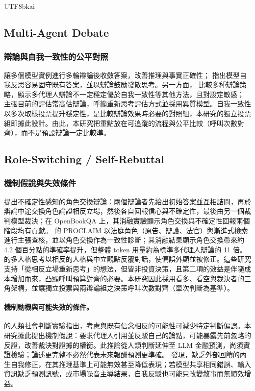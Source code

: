 \documentclass[12pt,a4paper]{article}
\begin{document}
\begin{CJK}{UTF8}{bkai}
\subsection{Multi-Agent Debate}

\subsubsection{辯論與自我一致性的公平對照}
\citet{du2023debate} 讓多個模型實例進行多輪辯論後收斂答案，改善推理與事實正確性；\citet{liang2023divergent} 指出模型自我反思容易固守既有答案，並以辯論鼓勵發散思考。另一方面，\citet{smit2023mad} 比較多種辯論策略，顯示多代理人辯論不一定穩定優於自我一致性等其他方法，且對設定敏感；\citet{zhang2025stop} 主張目前的評估常高估辯論，呼籲重新思考評估方式並採用異質模型。自我一致性 \citep{wang2023selfconsistency} 以多次取樣投票提升穩定性，是比較辯論效果時必要的對照組，本研究的獨立投票組即據此設計。由此，本研究把重點放在可追蹤的流程與公平比較（呼叫次數對齊），而不是預設辯論一定比較準。
\subsection{Role-Switching / Self-Rebuttal}

\subsubsection{機制假說與失效條件}
\citet{liu2025roleswitch} 提出不確定性感知的角色交換辯論：兩個辯論者先給出初始答案並互相詰問，再於辯論中途交換角色論證相反立場，然後各自回報信心與不確定性，最後由另一個裁判模型裁決；在 OpenBookQA 上，其消融實驗顯示角色交換與不確定性回報兩個階段均有貢獻。\citet{chowdhury2026proclaim} 的 PROCLAIM 以法庭角色（原告、辯護、法官）與漸進式檢索進行主張查核，並以角色交換作為一致性診斷；其消融結果顯示角色交換帶來約 4.2 個百分點的準確率提升，但整體 token 用量約為標準多代理人辯論的 11 倍。\citet{chen2026mpt} 的多人格思考以相反的人格與中立觀點反覆對話，使偏誤外顯並被修正。這些研究支持「從相反立場重新思考」的想法，但皆非投資決策，且第二項的效益是伴隨成本增加而來，凸顯呼叫預算對齊的必要。本研究因此採用看多、看空與裁決者的三角架構，並讓獨立投票與兩辯論組之決策呼叫次數對齊（單次判斷為基準）。\paragraph{機制動機與可能失效的條件。}
\citet{lord1984opposite} 的人類社會判斷實驗指出，考慮與既有信念相反的可能性可減少特定判斷偏誤。本研究據此提出機制假說：要求代理人引用並反駁自己的論點，可能暴露先前忽略的反證，改善裁決對證據的權衡。此推論從人類判斷延伸至 LLM 金融預測，尚須實證檢驗；論述更完整不必然代表未來報酬預測更準確。\citet{huang2024selfcorrect} 發現，缺乏外部回饋的內生自我修正，在其推理基準上可能無效甚至降低表現；若模型共享相同錯誤、輸入資訊缺乏預測訊號，或市場噪音主導結果，自我反駁也可能只改變敘事而無績效增益。



\end{CJK}
\end{document}
